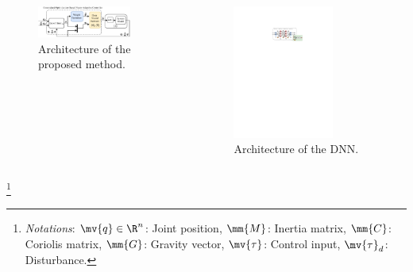 \documentclass[8pt, aspectratio=169]{beamer}
\begin{document}
\begin{frame}{\insertsubsectionhead}
\begin{columns}

      \begin{figure}
        \includegraphics[width=0.8\textwidth]{figures/Controller.drawio.pdf}
        \caption{Architecture of the proposed method.}
      \end{figure}

    {
      \begin{figure}
        \includegraphics[width=0.7\textwidth]{figures/DNN.drawio.pdf}
        \caption{Architecture of the DNN.}
      \end{figure}
    }

  \end{columns}

    \let\thefootnote\relax\footnote{
      \textit{Notations}: 
        $\mv{q}\in\R^n$: Joint position, $\mm{M}$: Inertia matrix, $\mm{C}$: Coriolis matrix, $\mm{G}$: Gravity vector, $\mv{\tau}$: Control input, $\mv{\tau}_d$: Disturbance.
      }

\end{frame}
\end{document}

